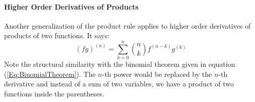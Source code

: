 
\paragraph{Higher Order Derivatives of Products}
Another generalization of the product rule applies to higher order derivatives of products of two functions. It says:
\begin{equation}
 (f g)^{(n)} = \sum_{k=0}^n \binom{n}{k}   f^{(n-k)} g^{(k)}
\end{equation}
Note the structural similarity with the binomial theorem given in equation (\ref{Eq:BinomialTheorem}). The $n$-th power would be replaced by the $n$-th derivative and instead of a sum of two variables, we have a product of two functions inside the parentheses. 


